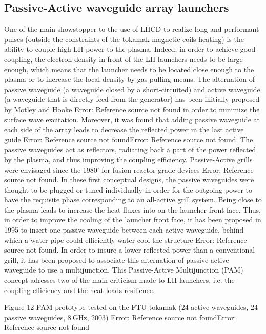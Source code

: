 \subsection{Passive-Active waveguide array launchers}
One of the main showstopper to the use of LHCD to realize long and performant pulses (outside the constraints of the tokamak magnetic coils heating) is the ability to couple high LH power to the plasma. Indeed, in order to achieve good coupling, the electron density in front of the LH launchers needs to be large enough, which means that the launcher needs to be located close enough to the plasma or to increase the local density by gas puffing means. 
The alternation of passive waveguide (a waveguide closed by a short-circuited) and active waveguide (a waveguide that is directly feed from the generator) has been initially proposed by Motley and Hooke Error: Reference source not found in order to minimize the surface wave excitation. Moreover, it was found that adding passive waveguide at each side of the array leads to decrease the reflected power in the last active guide Error: Reference source not foundError: Reference source not found. The passive waveguides act as reflectors, radiating back a part of the power reflected by the plasma, and thus improving the coupling efficiency. Passive-Active grills were envisaged since the 1980' for fusion-reactor grade devices Error: Reference source not found. In these first conceptual designs, the passive waveguides were thought to be plugged or tuned individually in order for the outgoing power to have the requisite phase corresponding to an all-active grill system. 
Being close to the plasma leads to increase the heat fluxes into on the launcher front face. Thus, in order to improve the cooling of the launcher front face, it has been proposed in 1995 to insert one passive waveguide between each active waveguide, behind which a water pipe could efficiently water-cool the structure Error: Reference source not found. 
In order to insure a lower reflected power than a conventional grill, it has been proposed to associate this alternation of passive-active waveguide to  use a multijunction. This Passive-Active Multijunction (PAM) concept adresses two of the main criticism made to LH launchers, i.e. the coupling efficiency and the heat loads resilience. 

Figure 12 PAM prototype tested on the FTU tokamak (24 active waveguides, 24 passive waveguides, 8 GHz, 2003) Error: Reference source not foundError: Reference source not found


